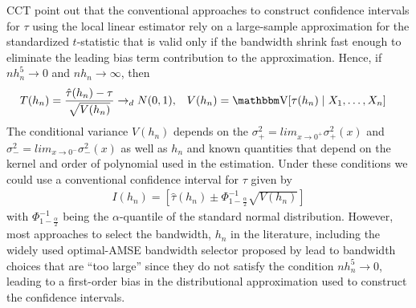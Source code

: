 \documentclass[12pt,fleqn]{article}
\begin{document}
CCT point out that the conventional approaches to construct confidence intervals for $\tau$ using the local linear estimator rely on a large-sample approximation for the standardized $t$-statistic that is valid only if the bandwidth shrink fast enough to eliminate the leading bias term contribution to the approximation. Hence, if $nh_{n}^{5}\rightarrow0$ and $nh_{n}\rightarrow \infty$, then
 \begin{align}
  T(h_{n}) &=\frac{\hat{\tau}(h_{n})-\tau}{\sqrt{V(h_{n})}}\rightarrow_{d}N(0,1), &
  V(h_{n}) &=\V[\tau(h_{n}) \mid X_{1},\dots,X_{n}]
 \end{align}
 The conditional variance $V(h_{n})$ depends on the $\sigma^{2}_{+}=lim_{x \rightarrow 0^{+}}\sigma^{2}_{+}(x)$ and $\sigma^{2}_{-}=lim_{x \rightarrow 0^{-}}\sigma^{2}_{-}(x)$ as well as $h_{n}$ and known quantities that depend on the kernel and order of polynomial used in the estimation. Under these conditions we could use a conventional confidence interval for $\tau$ given by
 \begin{align}
  I(h_{n})=\left[\hat{\tau}(h_{n})\pm \Phi^{-1}_{1-\frac{\alpha}{2}}\sqrt{V(h_{n})} \right]
 \end{align}
with $\Phi^{-1}_{1-\frac{\alpha}{2}}$ being the $\alpha$-quantile of the standard normal distribution. However, most approaches to select the bandwidth, $h_{n}$ in the literature, including the widely used optimal-AMSE bandwidth selector proposed by \cite{IK} lead to bandwidth choices that are ``too large'' since they do not satisfy the condition $nh_{n}^{5}\rightarrow0$, leading to a first-order bias in the distributional approximation used to construct the confidence intervals.
\end{document}
